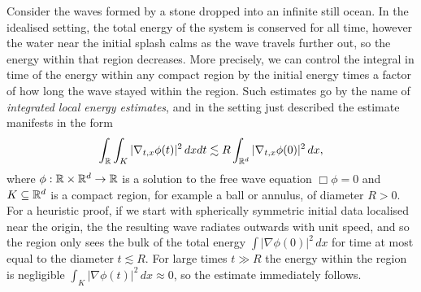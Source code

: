 Consider the waves formed by a stone dropped into an infinite still ocean. In the idealised setting, the total energy of the system is conserved for all time, however the water near the initial splash calms as the wave travels further out, so the energy within that region decreases. More precisely, we can control the integral in time of the energy within any compact region by the initial energy times a factor of how long the wave stayed within the region. Such estimates go by the name of \textit{integrated local energy estimates}, and in the setting just described the estimate manifests in the form 
	\[
		\int_\mathbb R \int_{K} |\nabla_{t, x} \phi (t)|^2  \, dx dt \lesssim  R \int_{\mathbb R^d} |\nabla_{t, x} \phi (0)|^2 \, dx,
	\]
where $\phi: \mathbb R \times \mathbb R^d \to \mathbb R$ is a solution to the free wave equation $\Box \phi = 0$ and $K \subseteq \mathbb R^d$ is a compact region, for example a ball or annulus, of diameter $R > 0$. For a heuristic proof, if we start with spherically symmetric initial data localised near the origin, the the resulting wave radiates outwards with unit speed, and so the region only sees the bulk of the total energy $\int |\nabla \phi (0)|^2 \, dx$ for time at most equal to the diameter $t \lesssim R$. For large times $t \gg R$ the energy within the region is negligible $\int_K |\nabla \phi(t)|^2 \, dx \approx 0$, so the estimate immediately follows. 


